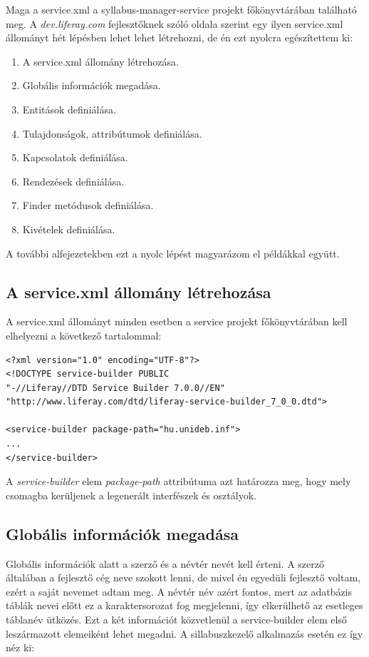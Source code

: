 \documentclass[hidelinks, 12pt, a4paper]{report}
\begin{document}
Maga a service.xml a syllabus-manager-service projekt főkönyvtárában található meg. A \emph{dev.liferay.com} fejlesztőknek szóló oldala szerint egy ilyen service.xml állományt hét lépésben lehet lehet létrehozni, de én ezt nyolcra egészítettem ki:
\begin{enumerate}
\item A service.xml állomány létrehozása.
\item Globális információk megadása.
\item Entitások definiálása.
\item Tulajdonságok, attribútumok definiálása.
\item Kapcsolatok definiálása.
\item Rendezések definiálása.
\item Finder metódusok definiálása.
\item Kivételek definiálása.
\end{enumerate}


A további alfejezetekben ezt a nyolc lépést magyarázom el példákkal együtt.

\subsection{A service.xml állomány létrehozása}

A service.xml állományt minden esetben a service projekt főkönyvtárában kell elhelyezni a következő tartalommal:

\begin{lstlisting}[style=customxml]
<?xml version="1.0" encoding="UTF-8"?>
<!DOCTYPE service-builder PUBLIC
"-//Liferay//DTD Service Builder 7.0.0//EN"
"http://www.liferay.com/dtd/liferay-service-builder_7_0_0.dtd">

<service-builder package-path="hu.unideb.inf">
...
</service-builder>
\end{lstlisting}

\noindent A \emph{service-builder} elem \emph{package-path} attribútuma azt határozza meg, hogy mely csomagba kerüljenek a legenerált interfészek és osztályok.

\subsection{Globális információk megadása}

Globális információk alatt a szerző és a névtér nevét kell érteni. A szerző általában a fejlesztő cég neve szokott lenni, de mivel én egyedüli fejlesztő voltam, ezért a saját nevemet adtam meg. A névtér név azért fontos, mert az adatbázis táblák nevei előtt ez a karaktersorozat fog megjelenni, így elkerülhető az esetleges táblanév ütközés. Ezt a két információt közvetlenül a service-builder elem első leszármazott elemeiként lehet megadni. A sillabuszkezelő alkalmazás esetén ez így néz ki:
\end{document}
